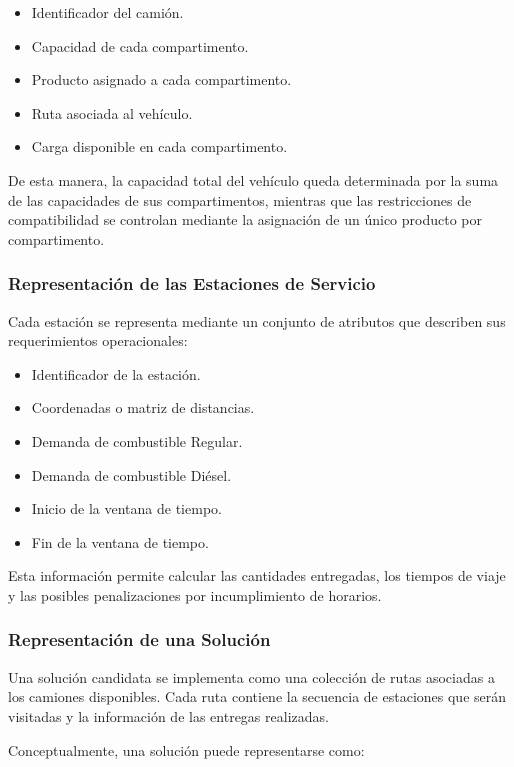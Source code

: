 \begin{itemize}
\item Identificador del camión.
\item Capacidad de cada compartimento.
\item Producto asignado a cada compartimento.
\item Ruta asociada al vehículo.
\item Carga disponible en cada compartimento.
\end{itemize}

De esta manera, la capacidad total del vehículo queda determinada por la suma de las capacidades de sus compartimentos, mientras que las restricciones de compatibilidad se controlan mediante la asignación de un único producto por compartimento.

\subsubsection{Representación de las Estaciones de Servicio}

Cada estación se representa mediante un conjunto de atributos que describen sus requerimientos operacionales:

\begin{itemize}
\item Identificador de la estación.
\item Coordenadas o matriz de distancias.
\item Demanda de combustible Regular.
\item Demanda de combustible Diésel.
\item Inicio de la ventana de tiempo.
\item Fin de la ventana de tiempo.
\end{itemize}

Esta información permite calcular las cantidades entregadas, los tiempos de viaje y las posibles penalizaciones por incumplimiento de horarios.

\subsubsection{Representación de una Solución}

Una solución candidata se implementa como una colección de rutas asociadas a los camiones disponibles. Cada ruta contiene la secuencia de estaciones que serán visitadas y la información de las entregas realizadas.

Conceptualmente, una solución puede representarse como:

